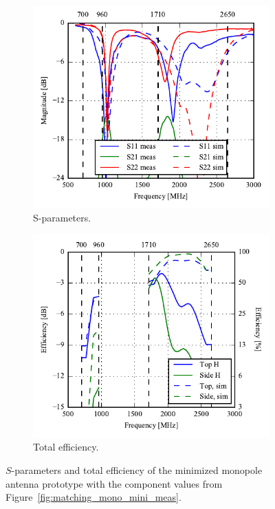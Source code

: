 \begin{figure}[htbp]
    \centering
    \begin{subfigure}{0.49\linewidth}
        \includegraphics{img/tech_sol/monopole/5mm/sparams_comp.pdf}
        \caption{S-parameters.}
    \end{subfigure}
    \hfill
    \begin{subfigure}{0.49\linewidth}
        \includegraphics{img/tech_sol/monopole/5mm/eff_comp.pdf}
        \caption{Total efficiency.}
    \end{subfigure}
    \caption{$S$-parameters and total efficiency of the minimized monopole antenna prototype with the component values from Figure~\ref{fig:matching_mono_mini_meas}.}
    \label{fig:mono_proto_sparam_eff}
\end{figure}

